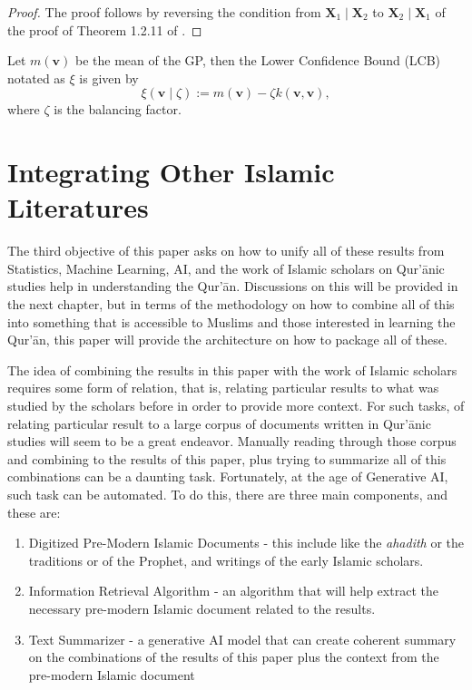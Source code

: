 \begin{proof}
    The proof follows by reversing the condition from $\mathbf{X}_1\mid\mathbf{X}_2$ to $\mathbf{X}_2\mid\mathbf{X}_1$ of the proof of Theorem 1.2.11 of \cite{muirhead2005}.
\end{proof}
\begin{defnx}\label{def:lcb}
    Let $m(\mathbf{v})$ be the mean of the GP, then the Lower Confidence Bound (LCB) notated as $\xi$ is given by
    \begin{equation}
        \xi(\mathbf{v}\mid\zeta):=m(\mathbf{v})-\zeta k(\mathbf{v},\mathbf{v}),
    \end{equation}
    where $\zeta$ is the balancing factor.
\end{defnx}
\section{Integrating Other Islamic Literatures}
The third objective of this paper asks on how to unify all of these results from Statistics, Machine Learning, AI, and the work of Islamic scholars on Qur'\=anic studies help in understanding the Qur'\=an. Discussions on this will be provided in the next chapter, but in terms of the methodology on how to combine all of this into something that is accessible to Muslims and those interested in learning the Qur'\=an, this paper will provide the architecture on how to package all of these.

The idea of combining the results in this paper with the work of Islamic scholars requires some form of relation, that is, relating particular results to what was studied by the scholars before in order to provide more context. For such tasks, of relating particular result to a large corpus of documents written in Qur'\=anic studies will seem to be a great endeavor. Manually reading through those corpus and combining to the results of this paper, plus trying to summarize all of this combinations can be a daunting task. Fortunately, at the age of Generative AI, such task can be automated. To do this, there are three main components, and these are: 
\begin{enumerate}
    \item Digitized Pre-Modern Islamic Documents - this include like the \textit{ahadith} or the traditions or   of the Prophet, and writings of the early Islamic scholars.
    \item Information Retrieval Algorithm - an algorithm that will help extract the necessary pre-modern Islamic document related to the results.
    \item Text Summarizer - a generative AI model that can create coherent summary on the combinations of the results of this paper plus the context from the pre-modern Islamic document
\end{enumerate}
